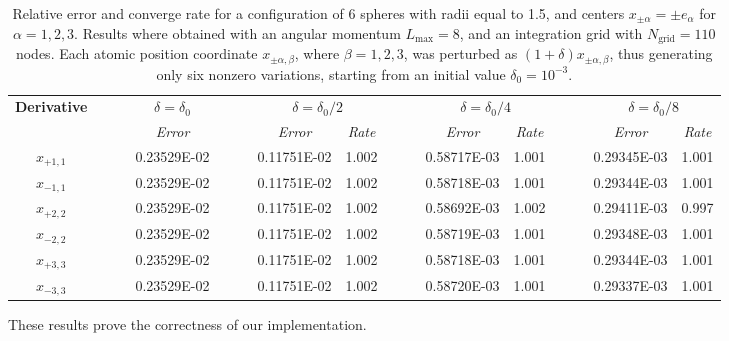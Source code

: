 \documentclass[aip,jcp,a4paper,11pt]{revtex4-1}
\begin{document}
\begin{table}[t]
\footnotesize
\begin{center}
	\begin{tabular}{ @{}cccc  cccc  cccc @{} }
\toprule[0.1em] 
\multirow{2}{*}{\bf Derivative} & $\phantom{abs}$ &  \multicolumn{1}{c}{$\delta = \delta_0$}& $\phantom{abs}$  & \multicolumn{2}{c}{$\delta = \delta_0/2$}& $\phantom{abs}$  & \multicolumn{2}{c}{$\delta = \delta_0/4$}& $\phantom{abs}$  & \multicolumn{2}{c}{$\delta = \delta_0/8$} \\
		         \cmidrule[0.05em]{3-3}  \cmidrule[0.05em](lr){5-6}  \cmidrule[0.05em]{8-9}   \cmidrule[0.05em]{11-12}
&	& {\sl Error}	&& {\sl Error}	& {\sl Rate} && {\sl Error}	& {\sl Rate}&& {\sl Error}	& {\sl Rate} \\
\midrule[0.05em]
$x_{+1,1}$ &  &  0.23529E-02  &  &    0.11751E-02  &  1.002  &&  0.58717E-03  &  1.001  &&  0.29345E-03  &  1.001  \\
$x_ {-1,1}$  &&  0.23529E-02  &   &  0.11751E-02  &  1.002  &&  0.58718E-03  &  1.001  &&  0.29344E-03  &  1.001  \\
$x_ {+2,2}$  &&  0.23529E-02  &   & 0.11751E-02  &  1.002  &&  0.58692E-03  &  1.002  &&  0.29411E-03  &  0.997  \\
$x_ {-2,2}$  &&  0.23529E-02  &    &0.11751E-02  &  1.002  &&  0.58719E-03  &  1.001  &&  0.29348E-03  &  1.001  \\
$x_ {+3,3}$  &&  0.23529E-02  &  &  0.11751E-02  &  1.002  &&  0.58718E-03  &  1.001  &&  0.29344E-03  &  1.001  \\
$x_ {-3,3}$  &&  0.23529E-02  &   &  0.11751E-02  &  1.002  &&  0.58720E-03  &  1.001  &&  0.29337E-03  &  1.001  \\
\bottomrule[0.1em]
\end{tabular}
\caption{Relative error and converge rate for a configuration of 6 spheres with radii equal to 1.5, and centers $x_{\pm \alpha} =  \pm e_\alpha$ for $\alpha = 1, 2,3$.  Results where obtained with an angular momentum $L_\text{max} =  8$, and an integration grid with $N_\text{grid} = 110$ nodes. Each atomic position coordinate $x_{\pm\alpha,\beta}$, where $\beta = 1,2,3$, was perturbed as $(1 + \delta)x_{\pm\alpha , \beta}$, thus generating only six nonzero variations, starting from an initial value $\delta_0 = 10^{-3}$.}\label{tab:1}
\end{center}
\end{table}
These results prove the correctness of our implementation. 
\end{document}
